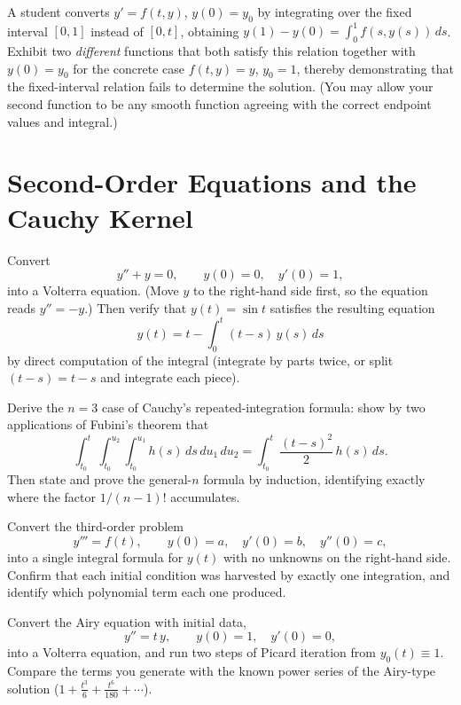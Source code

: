 \documentclass{essay}
\begin{document}
\begin{exercise}\label{ex:wrongway}
A student converts $y' = f(t,y)$, $y(0) = y_0$ by integrating over the fixed interval $[0, 1]$ instead of $[0, t]$, obtaining $y(1) - y(0) = \int_0^1 f(s, y(s))\,ds$. Exhibit two \emph{different} functions that both satisfy this relation together with $y(0) = y_0$ for the concrete case $f(t,y) = y$, $y_0 = 1$, thereby demonstrating that the fixed-interval relation fails to determine the solution. (You may allow your second function to be any smooth function agreeing with the correct endpoint values and integral.)
\end{exercise}

\section{Second-Order Equations and the Cauchy Kernel}

\begin{exercise}\label{ex:sine}
Convert
\[
y'' + y = 0, \qquad y(0) = 0, \quad y'(0) = 1,
\]
into a Volterra equation. (Move $y$ to the right-hand side first, so the equation reads $y'' = -y$.) Then verify that $y(t) = \sin t$ satisfies the resulting equation
\[
y(t) = t - \int_0^t (t - s)\, y(s)\, ds
\]
by direct computation of the integral (integrate by parts twice, or split $(t-s) = t - s$ and integrate each piece).
\end{exercise}

\begin{exercise}\label{ex:cauchy3}
Derive the $n = 3$ case of Cauchy's repeated-integration formula: show by two applications of Fubini's theorem that
\[
\int_{t_0}^{t}\!\!\int_{t_0}^{u_2}\!\!\int_{t_0}^{u_1} h(s)\, ds\, du_1\, du_2
= \int_{t_0}^{t} \frac{(t - s)^2}{2}\, h(s)\, ds.
\]
Then state and prove the general-$n$ formula by induction, identifying exactly where the factor $1/(n-1)!$ accumulates.
\end{exercise}

\begin{exercise}\label{ex:thirdorder}
Convert the third-order problem
\[
y''' = f(t), \qquad y(0) = a, \quad y'(0) = b, \quad y''(0) = c,
\]
into a single integral formula for $y(t)$ with no unknowns on the right-hand side. Confirm that each initial condition was harvested by exactly one integration, and identify which polynomial term each one produced.
\end{exercise}

\begin{exercise}\label{ex:airy}
Convert the Airy equation with initial data,
\[
y'' = t\,y, \qquad y(0) = 1, \quad y'(0) = 0,
\]
into a Volterra equation, and run two steps of Picard iteration from $y_0(t) \equiv 1$. Compare the terms you generate with the known power series of the Airy-type solution ($1 + \tfrac{t^3}{6} + \tfrac{t^6}{180} + \cdots$).
\end{exercise}
\end{document}
